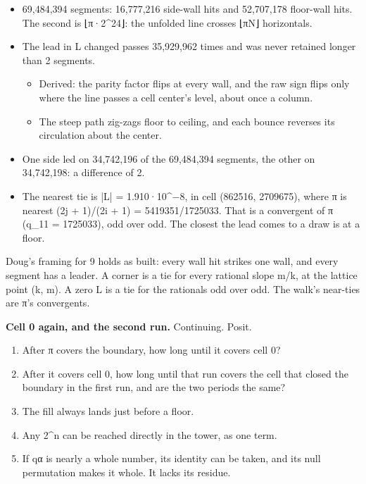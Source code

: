 \begin{itemize}
\item 69,484,394 segments: 16,777,216 side-wall hits and 52,707,178 floor-wall hits. The second is ⌊π·2\textasciicircum{}24⌋: the unfolded line crosses ⌊πN⌋ horizontals.
\item The lead in L changed passes 35,929,962 times and was never retained longer than 2 segments.

\begin{itemize}
\item Derived: the parity factor flips at every wall, and the raw sign flips only where the line passes a cell center's level, about once a column.
\item The steep path zig-zags floor to ceiling, and each bounce reverses its circulation about the center.
\end{itemize}
\item One side led on 34,742,196 of the 69,484,394 segments, the other on 34,742,198: a difference of 2.
\item The nearest tie is |L| = 1.910·10\textasciicircum{}−8, in cell (862516, 2709675), where π is nearest (2j + 1)/(2i + 1) = 5419351/1725033. That is a convergent of π (q\_\allowbreak{}11 = 1725033), odd over odd. The closest the lead comes to a draw is at a floor.
\end{itemize}

Doug's framing for 9 holds as built: every wall hit strikes one wall, and every segment has a leader. A corner is a tie for every rational slope m/k, at the lattice point (k, m). A zero L is a tie for the rationals odd over odd. The walk's near-ties are π's convergents.

\textbf{Cell 0 again, and the second run.} Continuing. Posit.

\begin{enumerate}
\item After π covers the boundary, how long until it covers cell 0?
\item After it covers cell 0, how long until that run covers the cell that closed the boundary in the first run, and are the two periods the same?
\item The fill always lands just before a floor.
\item Any 2\textasciicircum{}n can be reached directly in the tower, as one term.
\item If qα is nearly a whole number, its identity can be taken, and its null permutation makes it whole. It lacks its residue.
\end{enumerate}

